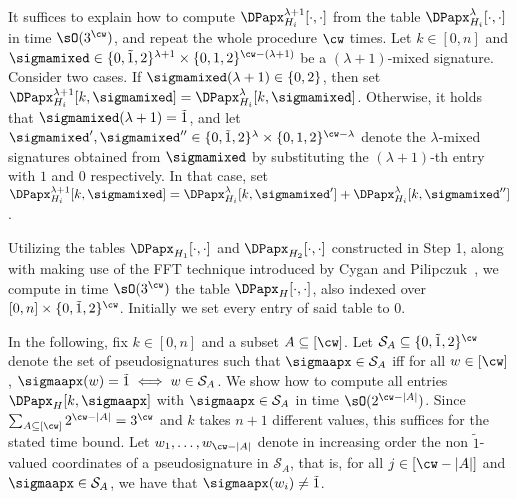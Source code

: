 It suffices to explain how to compute $\DPapx_{H_i}^{\lambda+1}[\cdot,\cdot]$ from the table
$\DPapx_{H_i}^{\lambda}[\cdot,\cdot]$ in time $\sO(3^{\cw})$, and repeat the whole procedure $\cw$ times.
Let $k \in [0,n]$ and $\sigmamixed \in \{0,\tilde{1},2\}^{\lambda+1} \times \{0,1,2\}^{\cw-(\lambda+1)}$
be a $(\lambda+1)$-mixed signature.
Consider two cases.
If $\sigmamixed(\lambda+1) \in \{0,2\}$,
then set $\DPapx_{H_i}^{\lambda+1}[k,\sigmamixed] = \DPapx_{H_i}^{\lambda}[k,\sigmamixed]$.
Otherwise, it holds that $\sigmamixed(\lambda+1) = \tilde{1}$,
and let $\sigmamixed', \sigmamixed'' \in \{0,\tilde{1},2\}^{\lambda} \times \{0,1,2\}^{\cw-\lambda}$
denote the $\lambda$-mixed signatures obtained from $\sigmamixed$ by substituting the $(\lambda+1)$-th
entry with $1$ and $0$ respectively.
In that case, set
$\DPapx_{H_i}^{\lambda+1}[k,\sigmamixed] = \DPapx_{H_i}^{\lambda}[k,\sigmamixed'] + \DPapx_{H_i}^{\lambda}[k,\sigmamixed'']$.


Utilizing the tables $\DPapx_{H_1}[\cdot,\cdot]$ and $\DPapx_{H_2}[\cdot,\cdot]$ constructed in Step 1,
along with making use of the FFT technique introduced by Cygan and Pilipczuk~\cite{tcs/CyganP10},
we compute in time $\sO(3^{\cw})$ the table $\DPapx_H[\cdot,\cdot]$,
also indexed over $[0,n] \times \{0,\tilde{1},2\}^{\cw}$.
Initially we set every entry of said table to $0$.

In the following, fix $k \in [0,n]$ and a subset $A \subseteq [\cw]$.
Let $\mathcal{S}_A \subseteq \{0,\tilde{1},2\}^{\cw}$ denote the set of pseudosignatures
such that $\sigmaapx \in \mathcal{S}_A$ iff for all $w \in [\cw]$, $\sigmaapx(w) = \tilde{1} \iff w \in \mathcal{S}_A$.
We show how to compute all entries $\DPapx_H[k,\sigmaapx]$ with $\sigmaapx \in \mathcal{S}_A$
in time $\sO(2^{\cw - |A|})$.
Since $\sum_{A \subseteq [\cw]} 2^{\cw - |A|} = 3^{\cw}$ and $k$ takes $n+1$ different
values, this suffices for the stated time bound.
Let $w_1, \ldots, w_{\cw-|A|}$ denote in increasing order the non $\tilde{1}$-valued coordinates of a pseudosignature in $\mathcal{S}_A$,
that is, for all $j \in [\cw-|A|]$ and $\sigmaapx \in \mathcal{S}_A$,
we have that $\sigmaapx(w_i) \neq \tilde{1}$.

